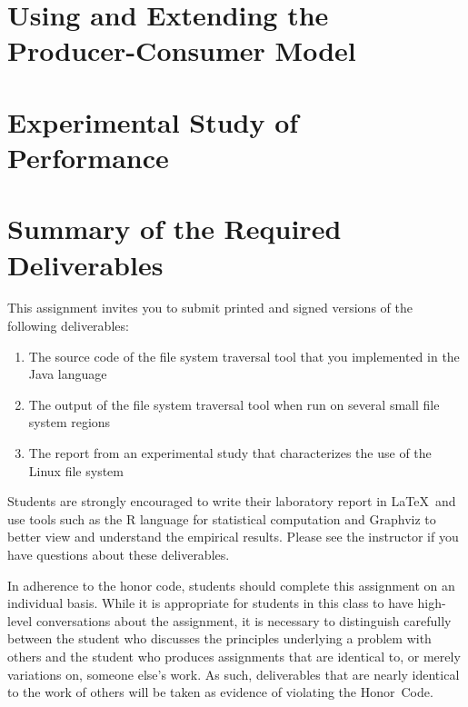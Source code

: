 \section*{Using and Extending the Producer-Consumer Model}



\section*{Experimental Study of Performance}

\section*{Summary of the Required Deliverables}

This assignment invites you to submit printed and signed versions of the following deliverables: 

  \begin{enumerate}
    \item The source code of the file system traversal tool that you implemented in the Java language
    \item The output of the file system traversal tool when run on several small file system regions
    \item The report from an experimental study that characterizes the use of the Linux file system
  \end{enumerate}

Students are strongly encouraged to write their laboratory report in \LaTeX~and use tools such as the R language for statistical
computation and Graphviz to better view and understand the empirical results. Please see the instructor if you have questions
about these deliverables.

In adherence to the honor code, students should complete this assignment on an individual basis. While it is appropriate for
students in this class to have high-level conversations about the assignment, it is necessary to distinguish carefully between the
student who discusses the principles underlying a problem with others and the student who produces assignments that are identical
to, or merely variations on, someone else's work.  As such, deliverables that are nearly identical to the work of others will be
taken as evidence of violating the \mbox{Honor Code}.  



  
